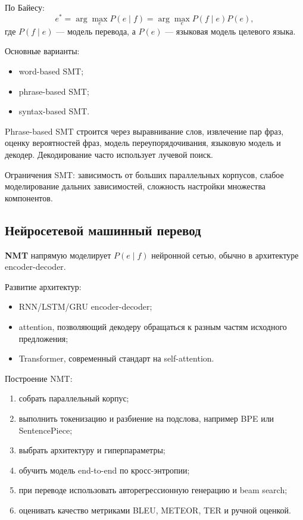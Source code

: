 По Байесу:
\[
e^*=\arg\max_e P(e\mid f)=\arg\max_e P(f\mid e)P(e),
\]
где $P(f\mid e)$ --- модель перевода, а $P(e)$ --- языковая модель целевого языка.

Основные варианты:
\begin{itemize}
    \item word-based SMT;
    \item phrase-based SMT;
    \item syntax-based SMT.
\end{itemize}

Phrase-based SMT строится через выравнивание слов, извлечение пар фраз, оценку вероятностей фраз, модель переупорядочивания, языковую модель и декодер. Декодирование часто использует лучевой поиск.

Ограничения SMT: зависимость от больших параллельных корпусов, слабое моделирование дальних зависимостей, сложность настройки множества компонентов.

\subsection*{Нейросетевой машинный перевод}

\textbf{NMT} напрямую моделирует $P(e\mid f)$ нейронной сетью, обычно в архитектуре encoder-decoder.

Развитие архитектур:
\begin{itemize}
    \item RNN/LSTM/GRU encoder-decoder;
    \item attention, позволяющий декодеру обращаться к разным частям исходного предложения;
    \item Transformer, современный стандарт на self-attention.
\end{itemize}

Построение NMT:
\begin{enumerate}
    \item собрать параллельный корпус;
    \item выполнить токенизацию и разбиение на подслова, например BPE или SentencePiece;
    \item выбрать архитектуру и гиперпараметры;
    \item обучить модель end-to-end по кросс-энтропии;
    \item при переводе использовать авторегрессионную генерацию и beam search;
    \item оценивать качество метриками BLEU, METEOR, TER и ручной оценкой.
\end{enumerate}

